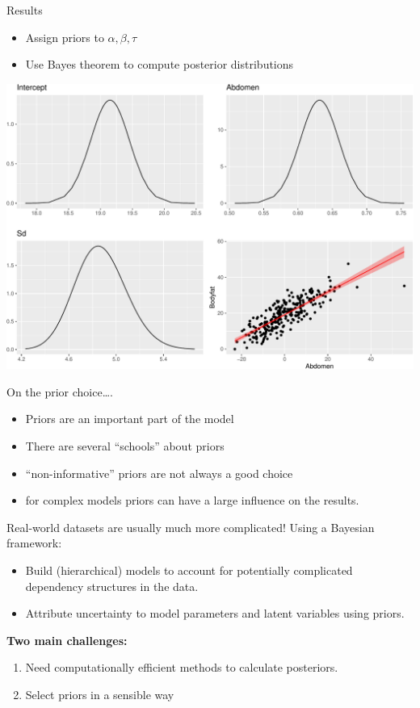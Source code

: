\documentclass[
  ignorenonframetext,
]{beamer}
\providecommand{\tightlist}{%
  \setlength{\itemsep}{0pt}\setlength{\parskip}{0pt}}
\begin{document}
\begin{frame}{Results}
\protect\hypertarget{results}{}
\begin{itemize}
\tightlist
\item
  Assign priors to \(\alpha,\beta,\tau\)
\item
  Use Bayes theorem to compute posterior distributions
\end{itemize}

\begin{center}\includegraphics[width=0.6\linewidth]{Part1_intro_files/figure-beamer/unnamed-chunk-7-1} \end{center}
\end{frame}

\begin{frame}{On the prior choice\ldots.}
\protect\hypertarget{on-the-prior-choice.}{}
\begin{itemize}
\tightlist
\item
  Priors are an important part of the model
\item
  There are several ``schools'' about priors
\item
  ``non-informative'' priors are not always a good choice
\item
  for complex models priors can have a large influence on the results.
\end{itemize}
\end{frame}

\begin{frame}{Real-world datasets are usually much more complicated!}
\protect\hypertarget{real-world-datasets-are-usually-much-more-complicated}{}
Using a Bayesian framework:

\begin{itemize}
\tightlist
\item
  Build (hierarchical) models to account for potentially complicated
  dependency structures in the data.
\item
  Attribute uncertainty to model parameters and latent variables using
  priors.
\end{itemize}

\textbf{Two main challenges:}

\begin{enumerate}
\tightlist
\item
  Need computationally efficient methods to calculate posteriors.
\item
  Select priors in a sensible way
\end{enumerate}
\end{frame}
\end{document}
